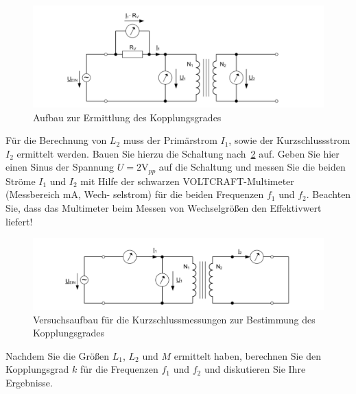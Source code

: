 \documentclass[10pt]{scrreprt}
\begin{document}
        \begin{center}
            \begin{figure}[H]
                \includegraphics[width=\textwidth]{aufgabenBilder/abbildung10.png}
                \caption{Aufbau zur Ermittlung des Kopplungsgrades}
                \label{fig:abb10}
            \end{figure}
        \end{center}

        Für die Berechnung von $L_2$ muss der Primärstrom $I_1$, sowie der Kurzschlussstrom $I_2$
        ermittelt werden. Bauen Sie hierzu die Schaltung nach~\ref{fig:abb11} auf. Geben Sie hier
        einen Sinus der Spannung $U = 2\si{\volt}_{pp}$ auf die Schaltung und messen Sie die beiden Ströme
        $I_1$ und $I_2$ mit Hilfe der schwarzen VOLTCRAFT-Multimeter (Messbereich mA, Wech-
        selstrom) für die beiden Frequenzen $f_1$ und $f_2$. Beachten Sie, dass das Multimeter beim
        Messen von Wechselgrößen den Effektivwert liefert!

        \begin{center}
            \begin{figure}[H]
                \includegraphics[width=\textwidth]{aufgabenBilder/abbildung11.png}
                \caption{Versuchsaufbau für die Kurzschlussmessungen zur Bestimmung des Kopplungsgrades}
                \label{fig:abb11}
            \end{figure}
        \end{center}

        Nachdem Sie die Größen $L_1$, $L_2$ und $M$ ermittelt haben, berechnen Sie den Kopplungsgrad
        $k$ für die Frequenzen $f_1$ und $f_2$ und diskutieren Sie Ihre Ergebnisse.
\end{document}
